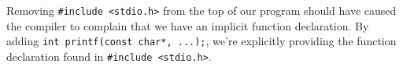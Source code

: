 %
Removing \texttt{#include <stdio.h>} from the top of our program
should have caused the compiler to complain that we have an implicit
function declaration.  By adding
\texttt{int printf(const char*, ...);}, we're explicitly providing
the function declaration found in \texttt{#include <stdio.h>}.
